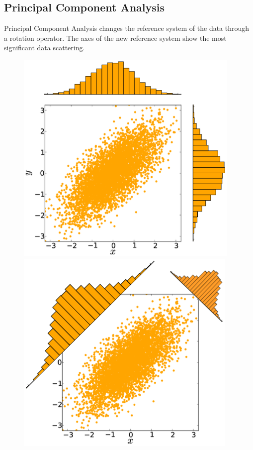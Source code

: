\documentclass{article}
\begin{document}
\subsection{Principal Component Analysis}
Principal Component Analysis changes the reference system of the data through a rotation operator. The axes of the new reference system show the most significant data scattering.

\begin{figure}[H]
   \begin{minipage}{0.48\textwidth}
     \centering
     \includegraphics[width=.9\linewidth]{assets/pca.png}
   \end{minipage}\hfill
   \begin{minipage}{0.48\textwidth}
     \centering
     \includegraphics[width=.92\linewidth]{assets/pca1.png}
   \end{minipage}
\end{figure}
\end{document}
